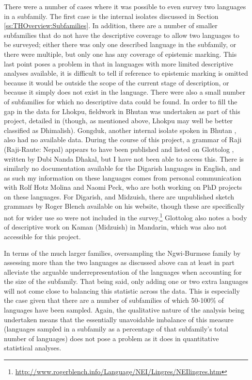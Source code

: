 There were a number of cases where it was possible to even survey two languages in a subfamily. The first case is the internal isolates discussed in Section \ref{ss:THOverview:Subfamilies}. In addition, there are a number of smaller subfamilies that do not have the descriptive coverage to allow two languages to be surveyed; either there was only one described language in the subfamily, or there were multiple, but only one has any coverage of epistemic marking. This last point poses a problem in that in languages with more limited descriptive analyses available, it is difficult to tell if reference to epistemic marking is omitted because it would be outside the scope of the current stage of description, or because it simply does not exist in the language. There were also a small number of subfamilies for which no descriptive data could be found. In order to fill the gap in the data for Lhokpu, fieldwork in Bhutan was undertaken as part of this project, detailed in  (though, as mentioned above, Lhokpu may well be better classified as Dhimalish). Gongduk, another internal isolate spoken in Bhutan \cite{VanDriem2001b}, also had no available data. During the course of this project, a grammar of Raji (Raji-Raute: Nepal) appears to have been published and listed on Glottolog \cite{glottolog}, written by Dubi Nanda Dhakal, but I have not been able to access this. There is similarly no documentation available for the Digarish languages in English, and as such my information on these languages comes from personal communication with Rolf Hotz Molina and Naomi Peck, who are both working on PhD projects on these languages. For Digarish, and Midzuish, there are unpublished sketch grammars by Roger Blench available on his website, though these are specifically not for wider use so were not included in the survey.\footnote{\url{http://www.rogerblench.info/Language/NEI/Lingres/NEIlingres.htm}} Glottolog also notes a body of descriptive work on Kaman (Midzuish) in Mandarin, which was also not accessible for this project.

In terms of the much larger families, oversampling the Ngwi-Burmese family by assessing more than the two languages as discussed above can at least in part alleviate the arguable underrepresentation of the languages when accounting for the size of the subfamily. That being said, only adding one or two extra languages will not come close to balancing this statistic across the data. This is especially the case given that there are a number of subfamilies of which 50-100\% of languages have been sampled. Again, the qualitative nature of the analysis being undertaken means that the essentially unavoidable imbalance of this measure (languages sampled in a subfamily as a percentage of that subfamily's total number of languages) does not pose a problem as it does in quantitative statistical analyses.

